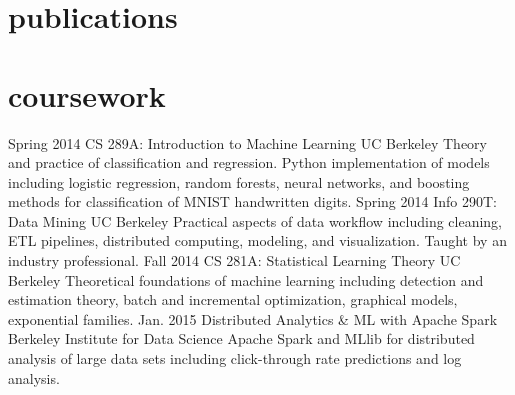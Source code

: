 \documentclass[]{friggeri-cv} %
\begin{document}

\section{publications}




\section{coursework}

\begin{entrylist}
\entry
{Spring 2014}
{CS 289A: Introduction to Machine Learning}
{UC Berkeley}
{Theory and practice of classification and regression. Python implementation of models including logistic regression, random forests, neural networks, and boosting methods for classification of MNIST handwritten digits.} 
\entry
{Spring 2014}
{Info 290T: Data Mining}
{UC Berkeley}
{Practical aspects of data workflow including cleaning, ETL pipelines, distributed computing, modeling, and visualization. Taught by an industry professional.}
\entry
{Fall 2014}
{CS 281A: Statistical Learning Theory}
{UC Berkeley}
{Theoretical foundations of machine learning including detection and estimation theory, batch and incremental optimization, graphical models, exponential families.}
\entry
{Jan. 2015}
{Distributed Analytics \& ML with Apache Spark}
{Berkeley Institute for Data Science}
{Apache Spark and MLlib for distributed analysis of large data sets including click-through rate predictions and log analysis.}
\end{entrylist}

\end{document}
